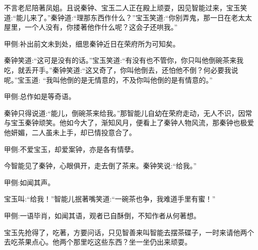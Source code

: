 \begin{parag}
    不言老尼陪著凤姐。且说秦钟、宝玉二人正在殿上顽耍，因见智能过来，宝玉笑道:“能儿来了。”秦钟道:“理那东西作什么？”宝玉笑道:“你别弄鬼，那一日在老太太屋里，一个人没有，你搂著他作什么呢？这会子还哄我。”\begin{note}甲侧:补出前文未到处，细思秦钟近日在荣府所为可知矣。\end{note}秦钟笑道:“这可是没有的话。”宝玉笑道:“有没有也不管你，你只叫他倒碗茶来我吃，就丢开手。”秦钟笑道:“这又奇了，你叫他倒去，还怕他不倒？何必要我说呢。”宝玉道: “我叫他倒的是无情意的，不及你叫他倒的是有情意的。”\begin{note}甲侧:总作如是等奇语。\end{note}秦钟只得说道:“能儿，倒碗茶来给我。”那智能儿自幼在荣府走动，无人不识，因常与宝玉秦钟顽笑。他如今大了，渐知风月，便看上了秦钟人物风流，那秦钟也极爱他妍媚，二人虽未上手，却已情投意合了。\begin{note}甲侧:不爱宝玉，却爱案钟，亦是各有情孽。\end{note}今智能见了秦钟，心眼俱开，走去倒了茶来。秦钟笑说:“给我。”\begin{note}甲侧:如闻其声。\end{note}宝玉叫:“给我！”智能儿抿著嘴笑道:“一碗茶也争，我难道手里有蜜！”\begin{note}甲侧:一语毕肖，如闻其语，观者已自酥倒，不知作者从何著想。\end{note}宝玉先抢得了，吃著，方要问话，只见智善来叫智能去摆茶碟子，一时来请他两个去吃茶果点心。他两个那里吃这些东西？坐一坐仍出来顽耍。
\end{parag}


